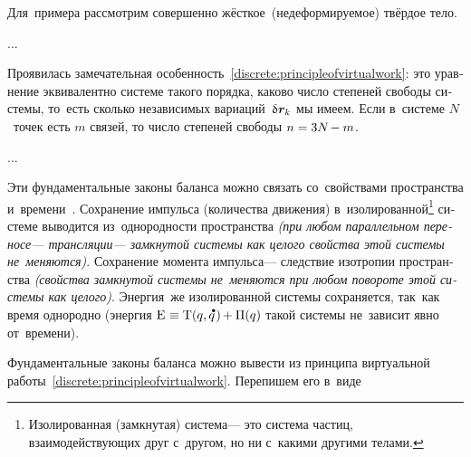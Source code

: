 \begin{otherlanguage}{russian}
Для~примера рассмотрим совершенно жёсткое~(недеформируемое) твёрдое тело.

...


Проявилась замечательная особенность~\eqref{discrete:principleofvirtualwork}: это уравнение эквивалентно системе такого порядка, каково число степеней свободы системы, то~есть сколько независимых вариаций~${\variation{\hspace{.1ex}\bm{r}_k}}$ мы имеем. Если в~системе $N$~точек есть $m$ связей, то число степеней свободы ${n = 3N \hspace{-0.25ex} - m}$.

...




Эти фундаментальные законы баланса можно связать со~свойствами пространства и~времени~\cite{landau.lifshitz-shortcourse}. Сохранение импульса (количества движения) в~изолированной\footnote{Изолированная (замкнутая) система\:--- это система частиц, взаимодействующих друг с~другом, но ни с~какими другими телами.} системе выводится из~однородности пространства \emph{(при любом параллельном переносе\:--- трансляции\:--- замкнутой системы как целого свойства этой системы не~меняются)}. Сохранение момента импульса\:--- следствие изотропии пространства \emph{(свойства замкнутой системы не~меняются при любом повороте этой системы как целого)}. Энергия~же изолированной системы сохраняется, так~как время однородно (энергия ${\mathrm{E} \hspace{.1ex} \equiv \mathrm{T}(q, \mathdotabove{q} \hspace{.2ex}) \hspace{-0.2ex} + \Pi(q)}$ такой системы не~зависит явно от~времени).

Фундаментальные законы баланса можно вывести из принципа виртуальной работы~\eqref{discrete:principleofvirtualwork}. Перепишем его в~виде


\end{otherlanguage}
